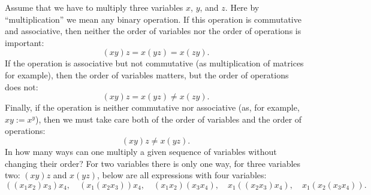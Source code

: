 

\setcounter{section}{4}
\setcounter{subsection}{3}
\setcounter{dfn}{4}

Assume that we have to multiply three variables $x$, $y$, and $z$.
Here by ``multiplication'' we mean any binary operation.
If this operation is commutative and associative, then neither the order of variables nor the order of operations is important:
\[
(xy)z = x(yz) = x(zy).
\]
If the operation is associative but not commutative (as multiplication of matrices for example),
then the order of variables matters, but the order of operations does not:
\[
(xy)z = x(yz) \ne x(zy).
\]
Finally, if the operation is neither commutative nor associative (as, for example, $xy := x^y$),
then we must take care both of the order of variables and the order of operations:
\[
(xy)z \ne x(yz).
\]
In how many ways can one multiply a given sequence of variables without changing their order?
For two variables there is only one way, for three variables two: $(xy)z$ and $x(yz)$,
below are all expressions with four variables:
\[
((x_1x_2)x_3)x_4, \quad (x_1(x_2x_3))x_4, \quad (x_1x_2)(x_3x_4), \quad x_1((x_2x_3)x_4), \quad x_1(x_2(x_3x_4)).
\]



